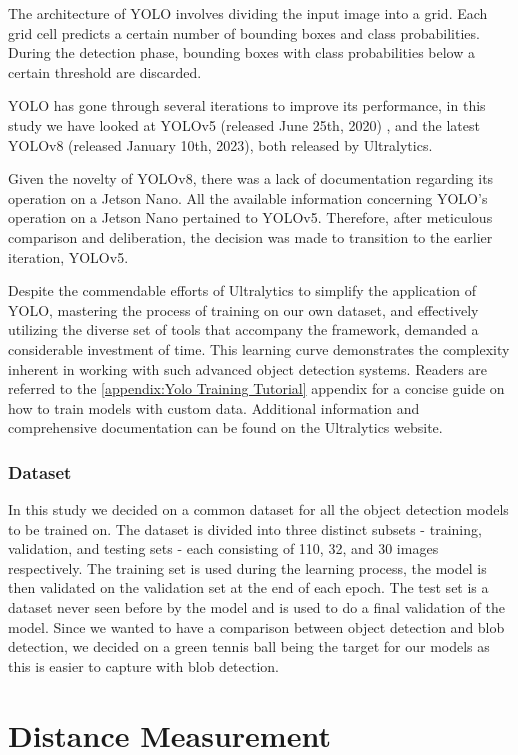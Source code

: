 The architecture of YOLO involves dividing the input image into a grid. Each grid cell predicts a certain number of bounding boxes and class probabilities. During the detection phase, bounding boxes with class probabilities below a certain threshold are discarded.

YOLO has gone through several iterations to improve its performance, in this study we have looked at YOLOv5 (released June 25th, 2020) \cite{YOLOv5}, and the latest YOLOv8 (released January 10th, 2023)\cite{YOLOv8}, both released by Ultralytics.

Given the novelty of YOLOv8, there was a lack of documentation regarding its operation on a Jetson Nano. All the available information concerning YOLO's operation on a Jetson Nano pertained to YOLOv5. Therefore, after meticulous comparison and deliberation, the decision was made to transition to the earlier iteration, YOLOv5.

Despite the commendable efforts of Ultralytics to simplify the application of YOLO, mastering the process of training on our own dataset, and effectively utilizing the diverse set of tools that accompany the framework, demanded a considerable investment of time. This learning curve demonstrates the complexity inherent in working with such advanced object detection systems. Readers are referred to the \ref{appendix:Yolo Training Tutorial} appendix for a concise guide on how to train models with custom data. Additional information and comprehensive documentation can be found on the Ultralytics website.

\subsubsection{Dataset}

In this study we decided on a common dataset for all the object detection models to be trained on. The dataset is divided into three distinct subsets - training, validation, and testing sets - each consisting of 110, 32, and 30 images respectively. The training set is used during the learning process, the model is then validated on the validation set at the end of each epoch. The test set is a dataset never seen before by the model and is used to do a final validation of the model.
Since we wanted to have a comparison between object detection and blob detection, we decided on a green tennis ball being the target for our models as this is easier to capture with blob detection.  


\section{Distance Measurement}

